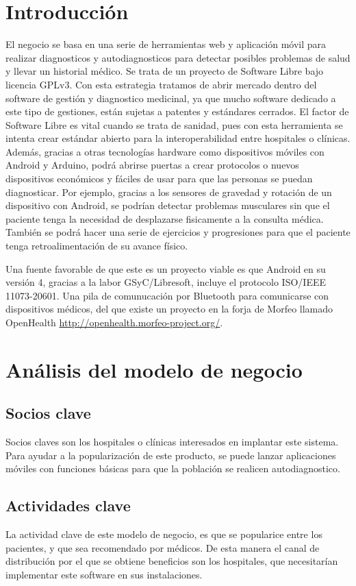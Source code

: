 \documentclass[11pt]{article}
\begin{document}
\section{Introducción}
El negocio se basa en una serie de herramientas web y aplicación móvil para realizar diagnosticos y autodiagnosticos para detectar posibles problemas de salud y llevar un historial médico.
Se trata de un proyecto de Software Libre bajo licencia GPLv3. Con esta estrategia tratamos de abrir mercado dentro del software de gestión y diagnostico medicinal, ya que mucho software dedicado a este tipo de gestiones, están sujetas a patentes y estándares cerrados. El factor de Software Libre es vital cuando se trata de sanidad, pues con esta herramienta se intenta crear estándar abierto para la interoperabilidad entre hospitales o clínicas. Además, gracias a otras tecnologías hardware como dispositivos móviles con Android y Arduino, podrá abrirse puertas a crear protocolos o nuevos dispositivos económicos y fáciles de usar para que las personas se puedan diagnosticar. Por ejemplo, gracias a los sensores de gravedad y rotación de un dispositivo con Android, se podrían detectar problemas musculares sin que el paciente tenga la necesidad de desplazarse fisicamente a la consulta médica. También se podrá hacer una serie de ejercicios y progresiones para que el paciente tenga retroalimentación de su avance físico. 

Una fuente favorable de que este es un proyecto viable es que Android en su versión 4, gracias a la labor GSyC/Libresoft, incluye el protocolo ISO/IEEE 11073-20601. Una pila de comunucación por Bluetooth para comunicarse con dispositivos médicos, del que existe un proyecto en la forja de Morfeo llamado OpenHealth \url{http://openhealth.morfeo-project.org/}.

\newpage

\section{Análisis del modelo de negocio}
\subsection{Socios clave}
Socios claves son los hospitales o clínicas interesados en implantar este sistema. Para ayudar a la popularización de este producto, se puede lanzar aplicaciones móviles con funciones básicas para que la población se realicen autodiagnostico.

\subsection{Actividades clave}
La actividad clave de este modelo de negocio, es que se popularice entre los pacientes, y que sea recomendado por médicos. De esta manera el canal de distribución por el que se obtiene beneficios son los hospitales, que necesitarían implementar este software en sus instalaciones.
\end{document}
